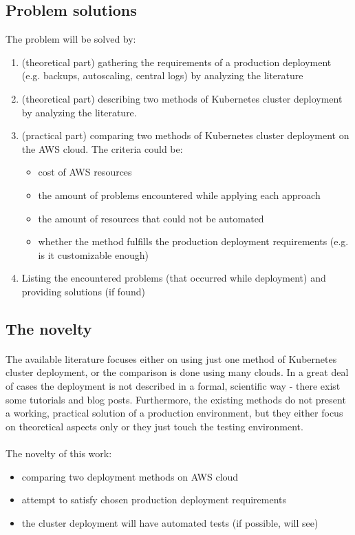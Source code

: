 \documentclass[12pt]{article}
\begin{document}
\subsection{Problem solutions}
The problem will be solved by:
\begin{enumerate}
    \item (theoretical part) gathering the requirements of a production deployment (e.g. backups, autoscaling, central logs) by analyzing the literature
    \item (theoretical part) describing two methods of Kubernetes cluster deployment by analyzing the literature. 
    \item (practical part) comparing two methods of Kubernetes cluster deployment on the AWS cloud. The criteria could be:
    \begin{itemize}
        \item cost of AWS resources
        \item the amount of problems encountered while applying each approach
        \item the amount of resources that could not be automated
        \item whether the method fulfills the production deployment requirements (e.g. is it customizable enough)
    \end{itemize}
    \item Listing the encountered problems (that occurred while deployment) and providing solutions (if found)
\end{enumerate}


\subsection{The novelty}
\paragraph{}
The available literature focuses either on using just one method of Kubernetes cluster deployment, or the comparison is done using many clouds. In a great deal of cases the deployment is not described in a formal, scientific way - there exist some tutorials and blog posts. Furthermore, the existing methods do not present a working, practical solution of a production environment, but they either focus on theoretical aspects only or they just touch the testing environment.
\paragraph{}
The novelty of this work:
\begin{itemize}
    \item comparing two deployment methods on AWS cloud
    \item attempt to satisfy chosen production deployment requirements
    \item the cluster deployment will have automated tests (if possible, will see)
\end{itemize}
\end{document}
